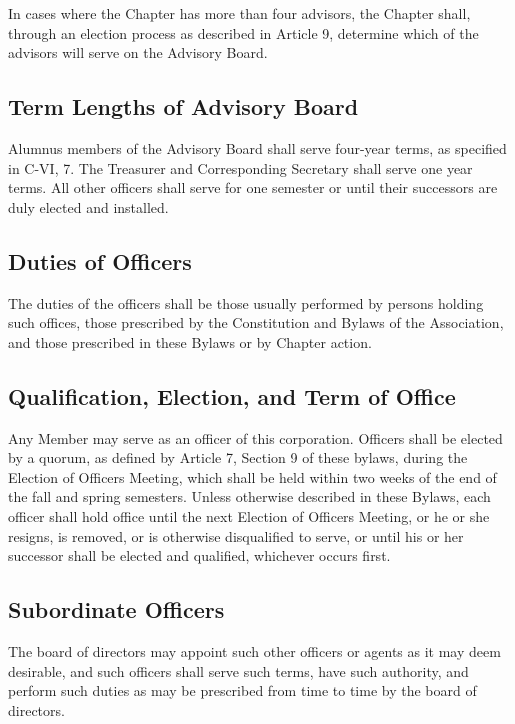 \documentclass{article}
\begin{document}
	In cases where the Chapter has more than four advisors, the Chapter shall, through an election process as described in Article 9, determine which of the advisors will serve on the Advisory Board.
	\subsection{Term Lengths of Advisory Board}
	Alumnus members of the Advisory Board shall serve four-year terms, as specified in C-VI, 7. The Treasurer and Corresponding Secretary shall serve one year terms. All other officers shall serve for one semester or until their successors are duly elected and installed.
	\subsection{Duties of Officers}
	The duties of the officers shall be those usually performed by persons holding such offices, those prescribed by the Constitution and Bylaws of the Association, and those prescribed in these Bylaws or by Chapter action.
	\subsection{Qualification, Election, and Term of Office}
	Any Member may serve as an officer of this corporation. Officers shall be elected by a quorum, as defined by Article 7, Section 9 of these bylaws, during the Election of Officers Meeting, which shall be held within two weeks of the end of the fall and spring semesters. Unless otherwise described in these Bylaws, each officer shall hold office until the next Election of Officers Meeting, or he or she resigns, is removed, or is otherwise disqualified to serve, or until his or her successor shall be elected and qualified, whichever occurs first.
	\subsection{Subordinate Officers}
	The board of directors may appoint such other officers or agents as it may deem desirable, and such officers shall serve such terms, have such authority, and perform such duties as may be prescribed from time to time by the board of directors.
\end{document}
